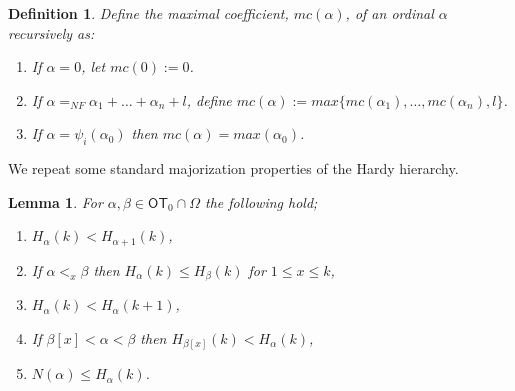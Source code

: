 \documentclass{amsart}
\theoremstyle{plain}
\theoremstyle{plain}
\newtheorem{lemma}[theorem]{Lemma}
\newtheorem*{definition}{Definition}
\newcommand\OT{\mathsf{OT}}
\newcommand{\Om}{{\Omega}}
\newcommand{\al}{{\alpha}}
\newcommand{\be}{{\beta}}
\begin{document}
\begin{definition} Define the maximal coefficient, $mc(\al)$, of an ordinal $\al$ recursively as:
\begin{enumerate}[label=(\roman*)]
\item If $\al=0$, let $mc(0) := 0$.
\item If $\al =_{NF} \al_1+\ldots+\al_n +l$, define $mc(\al) := max \{ mc(\al_1), \ldots , mc(\al_n), l\}$.
\item If $\al=\psi_i(\al_0)$ then $mc(\al)=max(\al_0)$. 
\end{enumerate}
\end{definition}

We repeat some standard majorization properties of the Hardy hierarchy.
\begin{lemma} \label{lm:Hprop} For $\al,\be \in \OT_0\cap \Om$ the following hold;
\begin{enumerate}
    \item \label{case1:lm:Hprop} $H_\al(k)<H_{\al+1}(k)$,
    
    \item  \label{case2:lm:Hprop} If $\al <_{x} \be$ then $H_\al(k) \leq H_{\be}(k)$ for $1\leq x \leq k$,
    
    \item \label{case3:lm:Hprop} $H_\al(k) < H_\al(k+1)$,
    
    \item If $\be[x]<\al<\be$  then  $H_{\be[x]}(k)<H_\al(k)$,
    
    \item 	$N(\al) \leq H_\al(k)$.
\end{enumerate}
\end{lemma}
\end{document}
